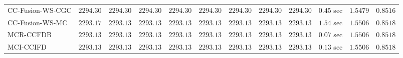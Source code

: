 \begin{table}[H]
\begin{tabular}{lrrrrrrrrrrr}
    CC-Fusion-WS-CGC & $      2294.30$ & $      2294.30$ & $      2294.30$ & $      2294.30$ & $      2294.30$ & $      2294.30$ & $      2294.30$ & $      2294.30$ & $         0.45$ sec    & $       1.5479$  & $       0.8516$ \\ 
     CC-Fusion-WS-MC & $      2293.17$ & $      2293.13$ & $      2293.13$ & $      2293.13$ & $      2293.13$ & $      2293.13$ & $      2293.13$ & $      2293.13$ & $         1.54$ sec    & $       1.5506$  & $       0.8518$ \\ 
\cmidrule{1-1} 
           MCR-CCFDB & $      2293.13$ & $      2293.13$ & $      2293.13$ & $      2293.13$ & $      2293.13$ & $      2293.13$ & $      2293.13$ & $      2293.13$ & $         0.07$ sec    & $       1.5506$  & $       0.8518$ \\ 
\cmidrule{1-1} 
           MCI-CCIFD & $      2293.13$ & $      2293.13$ & $      2293.13$ & $      2293.13$ & $      2293.13$ & $      2293.13$ & $      2293.13$ & $      2293.13$ & $         0.13$ sec    & $       1.5506$  & $       0.8518$ \\ 
\bottomrule
\end{tabular}
\end{table}

